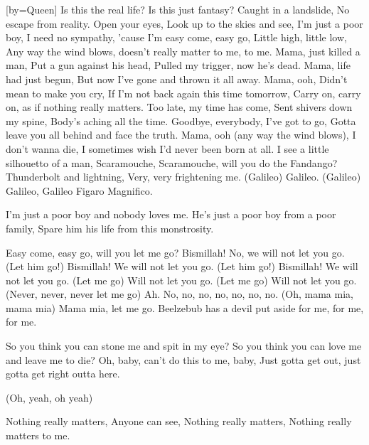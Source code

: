 [by={Queen}]
\beginverse\singlespacing
Is this the real life?
Is this just fantasy?
Caught in a landslide,
No escape from reality.
Open your eyes,
Look up to the skies and see,
I'm just a poor boy, I need no sympathy,
'cause I'm easy come, easy go,
Little high, little low,
Any way the wind blows, doesn't really matter to me, to me.
\endverse
\beginverse\singlespacing
Mama, just killed a man,
Put a gun against his head,
Pulled my trigger, now he's dead.
Mama, life had just begun,
But now I've gone and thrown it all away.
Mama, ooh,
Didn't mean to make you cry,
If I'm not back again this time tomorrow,
Carry on, carry on, as if nothing really matters.
\endverse
\beginverse\singlespacing
Too late, my time has come,
Sent shivers down my spine,
Body's aching all the time.
Goodbye, everybody, I've got to go,
Gotta leave you all behind and face the truth.
Mama, ooh (any way the wind blows),
I don't wanna die,
I sometimes wish I'd never been born at all.
\endverse
\beginverse\singlespacing
I see a little silhouetto of a man,
Scaramouche, Scaramouche, will you do the Fandango?
Thunderbolt and lightning,
Very, very frightening me.
(Galileo) Galileo.
(Galileo) Galileo,
Galileo Figaro
Magnifico.
\endverse

\beginverse\singlespacing
I'm just a poor boy and nobody loves me.
He's just a poor boy from a poor family,
Spare him his life from this monstrosity.
\endverse

\beginverse\singlespacing
Easy come, easy go, will you let me go?
Bismillah! No, we will not let you go.
(Let him go!) Bismillah! We will not let you go.
(Let him go!) Bismillah! We will not let you go.
(Let me go) Will not let you go.
(Let me go) Will not let you go.
(Never, never, never let me go) Ah.
No, no, no, no, no, no, no.
(Oh, mama mia, mama mia) Mama mia, let me go.
Beelzebub has a devil put aside for me, for me, for me.
\endverse

\beginverse\singlespacing
So you think you can stone me and spit in my eye?
So you think you can love me and leave me to die?
Oh, baby, can't do this to me, baby,
Just gotta get out, just gotta get right outta here.

(Oh, yeah, oh yeah)

Nothing really matters,
Anyone can see,
Nothing really matters,
Nothing really matters to me.
\endverse
\endsong
